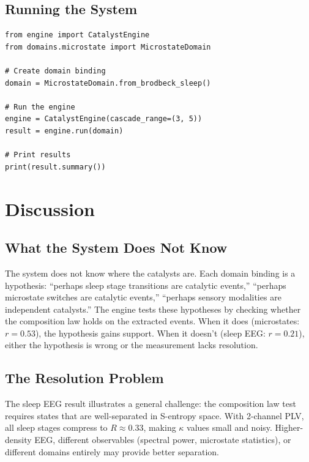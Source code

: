 \documentclass[11pt,a4paper]{article}
\theoremstyle{definition}
\theoremstyle{remark}
\newcommand{\Rorder}{R}
\begin{document}
\subsection{Running the System}

\begin{lstlisting}[style=python]
from engine import CatalystEngine
from domains.microstate import MicrostateDomain

# Create domain binding
domain = MicrostateDomain.from_brodbeck_sleep()

# Run the engine
engine = CatalystEngine(cascade_range=(3, 5))
result = engine.run(domain)

# Print results
print(result.summary())
\end{lstlisting}

\section{Discussion}
\label{sec:discussion}

\subsection{What the System Does Not Know}

The system does not know where the catalysts are. Each domain binding is a hypothesis: ``perhaps sleep stage transitions are catalytic events,'' ``perhaps microstate switches are catalytic events,'' ``perhaps sensory modalities are independent catalysts.'' The engine tests these hypotheses by checking whether the composition law holds on the extracted events. When it does (microstates: $r = 0.53$), the hypothesis gains support. When it doesn't (sleep EEG: $r = 0.21$), either the hypothesis is wrong or the measurement lacks resolution.

\subsection{The Resolution Problem}

The sleep EEG result illustrates a general challenge: the composition law test requires states that are well-separated in S-entropy space. With 2-channel PLV, all sleep stages compress to $\Rorder \approx 0.33$, making $\kappa$ values small and noisy. Higher-density EEG, different observables (spectral power, microstate statistics), or different domains entirely may provide better separation.
\end{document}
